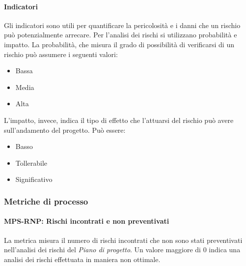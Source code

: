\documentclass[../../norme-di-progetto.tex]{subfiles}
\begin{document}
\paragraph{Indicatori}%
\label{par:indicatori}

Gli indicatori sono utili per quantificare la pericolosità e i danni che un rischio può potenzialmente arrecare. Per l'analisi dei rischi si utilizzano probabilità e impatto. La probabilità, che misura il grado di possibilità di verificarsi di un rischio può assumere i seguenti valori:
\begin{itemize}
  \item Bassa
  \item Media
  \item Alta
\end{itemize}
L'impatto, invece, indica il tipo di effetto che l'attuarsi del rischio può avere sull'andamento del progetto. Può essere:
\begin{itemize}
  \item Basso
  \item Tollerabile
  \item Significativo
\end{itemize}

\subsubsection{Metriche di processo}%
\label{subs:gestione_dei_rischi/metriche_di_processo}

\paragraph{MPS-RNP: Rischi incontrati e non preventivati}%
\label{par:MPS-RNP_rischi_incontrati_e_non_preventivati}

La metrica misura il numero di rischi incontrati che non sono stati preventivati nell'analisi dei rischi del \textit{Piano di progetto}. Un valore maggiore di 0 indica una analisi dei rischi effettuata in maniera non ottimale.
\end{document}

